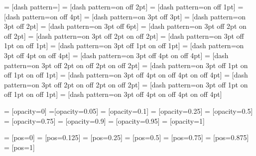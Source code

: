 =                   [dash pattern=]
=                  [dash pattern=on \pgflinewidth off 2pt]
=          [dash pattern=on \pgflinewidth off 1pt]
=          [dash pattern=on \pgflinewidth off 4pt]
=                  [dash pattern=on 3pt off 3pt]
=          [dash pattern=on 3pt off 2pt]
=          [dash pattern=on 3pt off 6pt]
=              [dash pattern=on 3pt off 2pt on \the\pgflinewidth off 2pt]
=                [dash pattern=on 3pt off 2pt on \the\pgflinewidth off 2pt]
=      [dash pattern=on 3pt off 1pt on \the\pgflinewidth off 1pt]
=        [dash pattern=on 3pt off 1pt on \the\pgflinewidth off 1pt]
=      [dash pattern=on 3pt off 4pt on \the\pgflinewidth off 4pt]
=        [dash pattern=on 3pt off 4pt on \the\pgflinewidth off 4pt]
=           [dash pattern=on 3pt off 2pt on \the\pgflinewidth off 2pt on \the\pgflinewidth off 2pt]
=   [dash pattern=on 3pt off 1pt on \the\pgflinewidth off 1pt on \the\pgflinewidth off 1pt]
=   [dash pattern=on 3pt off 4pt on \the\pgflinewidth off 4pt on \the\pgflinewidth off 4pt]
=         [dash pattern=on 3pt off 2pt on \the\pgflinewidth off 2pt on \the\pgflinewidth off 2pt]
=   [dash pattern=on 3pt off 1pt on \the\pgflinewidth off 1pt on \the\pgflinewidth off 1pt]
=   [dash pattern=on 3pt off 4pt on \the\pgflinewidth off 4pt on \the\pgflinewidth off 4pt]


=             [opacity=0]
=[opacity=0.05]
= [opacity=0.1]
=      [opacity=0.25]
=         [opacity=0.5]
=           [opacity=0.75]
=      [opacity=0.9]
=     [opacity=0.95]
=                  [opacity=1]

=                [pos=0]
=         [pos=0.125]
=              [pos=0.25]
=                  [pos=0.5]
=                [pos=0.75]
=           [pos=0.875]
=                  [pos=1]

